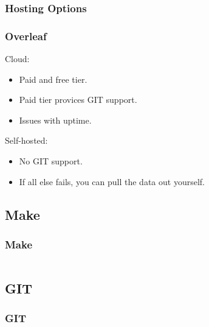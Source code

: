 {\subsubsection{Hosting Options}
\begin{frame}[fragile]
  \frametitle{Overleaf }
  \vspace{3mm}
  Cloud:
  \begin{itemize}
    \item Paid and free tier.
    \item Paid tier provices GIT support.
    \item Issues with uptime.
  \end{itemize}
  
  \vspace{5mm}
  Self-hosted:
  \begin{itemize}
    \item No GIT support.
    \item If all else fails, you can pull the data out yourself.
  \end{itemize}
\end{frame}

\subsection{Make}
\begin{frame}[fragile]
  \frametitle{Make}
  \vspace{-1mm}
  \inputminted[fontsize=\tiny]{make}{Makefile}
\end{frame}

\subsection{GIT}
\begin{frame}[fragile]
  \frametitle{GIT}
  \vspace{3mm}
  
\end{frame}

}


